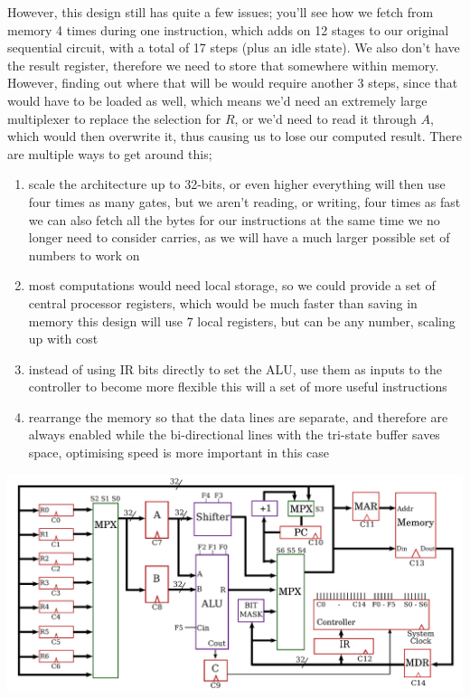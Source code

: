 \documentclass[a4paper, 12pt]{article}
\begin{document}
            However, this design still has quite a few issues; you'll see how we fetch from memory 4 times during one instruction, which adds on 12 stages to our original sequential circuit, with a total of 17 steps (plus an idle state). We also don't have the result register, therefore we need to store that somewhere within memory. However, finding out where that will be would require another 3 steps, since that would have to be loaded as well, which means we'd need an extremely large multiplexer to replace the selection for $R$, or we'd need to read it through $A$, which would then overwrite it, thus causing us to lose our computed result. There are multiple ways to get around this;
            \begin{enumerate}[1.]
                \itemsep0em
                \item scale the architecture up to 32-bits, or even higher
                    \subitem everything will then use four times as many gates, but we aren't reading, or writing, four times as fast
                    \subitem we can also fetch all the bytes for our instructions at the same time
                    \subitem we no longer need to consider carries, as we will have a much larger possible set of numbers to work on
                \item most computations would need local storage, so we could provide a set of central processor registers, which would be much faster than saving in memory
                    \subitem this design will use 7 local registers, but can be any number, scaling up with cost
                \item instead of using IR bits directly to set the ALU, use them as inputs to the controller to become more flexible
                    \subitem this will a set of more useful instructions
                \item rearrange the memory so that the data lines are separate, and therefore are always enabled
                    \subitem while the bi-directional lines with the tri-state buffer saves space, optimising speed is more important in this case
            \end{enumerate}

            \includegraphics[width=\linewidth]{2019-04-11-18-21-11.png}
\end{document}
